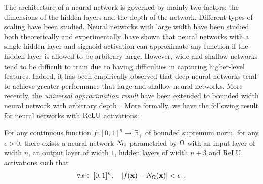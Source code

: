 The architecture of a neural network is governed by mainly two factors: the dimensions of the hidden layers and the depth of the network.
Different types of scaling have been studied.
Neural networks with large width have been studied both theoretically and experimentally.
\citet{cybenko1989approximation,hornik1989multilayer} have shown that neural networks with a single hidden layer and sigmoid activation can approximate any function if the hidden layer is allowed to be arbitrary large. 
However, wide and shallow networks tend to be difficult to train due to having difficulties in capturing higher-level features. 
Indeed, it has been empirically observed that deep neural networks tend to achieve greater performance that large and shallow neural networks.
More recently, the \emph{universal approximation result} have been extended to bounded width neural network with arbitrary depth~\cite{lu2017expressive,hanin2017universal}.
More formally, we have the following result for neural networks with $\operatorname{ReLU}$ activations:
\begin{maintheorem}
  For any continuous function $f:[0,1]^{n} \rightarrow \mathbb{R}_+$ of bounded supremum norm, for any $\epsilon>0$, there exists a neural network $N_\Omega$ parametried by $\Omega$ with an input layer of width $n$, an output layer of width $1$, hidden layers of width $n+3$ and ReLU activations such that 
  \begin{equation}
    \forall x \in [0,1]^n, \quad \left| f(\xvec) - \nn_\weights(\xvec) \right| < \epsilon \enspace.
  \end{equation}
  \vspace{-2em}
\end{maintheorem}


%
%
%



